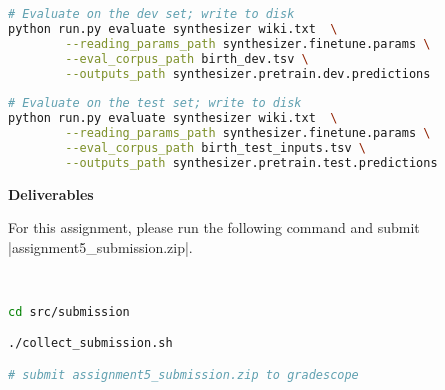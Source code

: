 \begin{enumerate}[(a)]
\begin{lstlisting}[language=bash]
# Evaluate on the dev set; write to disk
python run.py evaluate synthesizer wiki.txt  \
        --reading_params_path synthesizer.finetune.params \
        --eval_corpus_path birth_dev.tsv \
        --outputs_path synthesizer.pretrain.dev.predictions
        
# Evaluate on the test set; write to disk
python run.py evaluate synthesizer wiki.txt  \
        --reading_params_path synthesizer.finetune.params \
        --eval_corpus_path birth_test_inputs.tsv \
        --outputs_path synthesizer.pretrain.test.predictions
\end{lstlisting}



    

\end{enumerate}




\textbf{Deliverables}

For this assignment, please run the following command and submit |assignment5_submission.zip|.

\begin{lstlisting}[language=bash]


cd src/submission

./collect_submission.sh

# submit assignment5_submission.zip to gradescope
\end{lstlisting}

